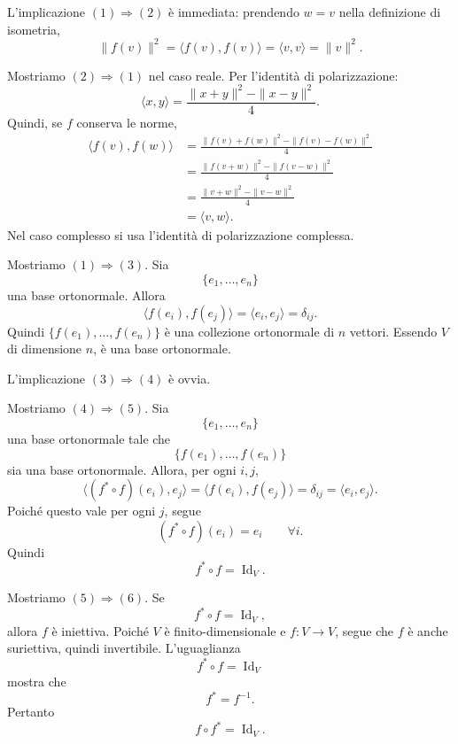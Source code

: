 \documentclass[a4paper]{article}
\begin{document}
\begin{snippetproof}{}
    L'implicazione \((1)\Rightarrow(2)\) è immediata: prendendo \(w=v\) nella definizione di isometria,
    \[
        \|f(v)\|^2
        =
        \langle f(v),f(v)\rangle
        =
        \langle v,v\rangle
        =
        \|v\|^2.
    \]

    Mostriamo \((2)\Rightarrow(1)\) nel caso reale. Per l'identità di polarizzazione:
    \[
        \langle x,y\rangle
        =
        \frac{\|x+y\|^2-\|x-y\|^2}{4}.
    \]
    Quindi, se \(f\) conserva le norme,
    \begin{align*}
        \langle f(v),f(w)\rangle
        &=
        \frac{\|f(v)+f(w)\|^2-\|f(v)-f(w)\|^2}{4}\\
        &=
        \frac{\|f(v+w)\|^2-\|f(v-w)\|^2}{4}\\
        &=
        \frac{\|v+w\|^2-\|v-w\|^2}{4}\\
        &=
        \langle v,w\rangle.
    \end{align*}
    Nel caso complesso si usa l'identità di polarizzazione complessa.

    Mostriamo \((1)\Rightarrow(3)\). Sia
    \[
        \{e_1,\ldots,e_n\}
    \]
    una base ortonormale. Allora
    \[
        \langle f(e_i),f(e_j)\rangle
        =
        \langle e_i,e_j\rangle
        =
        \delta_{ij}.
    \]
    Quindi \(\{f(e_1),\ldots,f(e_n)\}\) è una collezione ortonormale di \(n\) vettori. Essendo \(V\) di dimensione \(n\), è una base ortonormale.

    L'implicazione \((3)\Rightarrow(4)\) è ovvia.

    Mostriamo \((4)\Rightarrow(5)\). Sia
    \[
        \{e_1,\ldots,e_n\}
    \]
    una base ortonormale tale che
    \[
        \{f(e_1),\ldots,f(e_n)\}
    \]
    sia una base ortonormale. Allora, per ogni \(i,j\),
    \[
        \langle (f^*\circ f)(e_i),e_j\rangle
        =
        \langle f(e_i),f(e_j)\rangle
        =
        \delta_{ij}
        =
        \langle e_i,e_j\rangle.
    \]
    Poiché questo vale per ogni \(j\), segue
    \[
        (f^*\circ f)(e_i)=e_i
        \qquad
        \forall i.
    \]
    Quindi
    \[
        f^*\circ f=\operatorname{Id}_V.
    \]

    Mostriamo \((5)\Rightarrow(6)\). Se
    \[
        f^*\circ f=\operatorname{Id}_V,
    \]
    allora \(f\) è iniettiva. Poiché \(V\) è finito-dimensionale e \(f:V\to V\), segue che \(f\) è anche suriettiva, quindi invertibile. L'uguaglianza
    \[
        f^*\circ f=\operatorname{Id}_V
    \]
    mostra che
    \[
        f^*=f^{-1}.
    \]
    Pertanto
    \[
        f\circ f^*=\operatorname{Id}_V.
    \]


\end{snippetproof}
\end{document}
